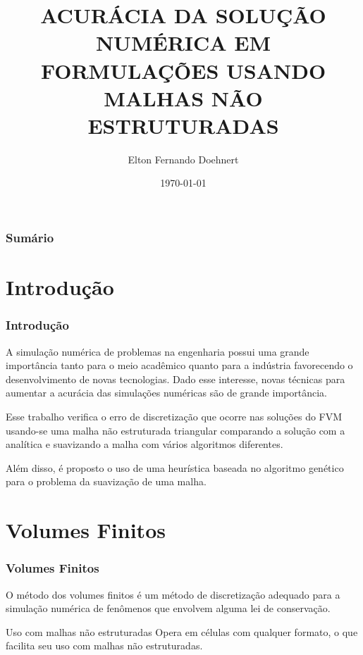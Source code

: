 \documentclass[brazil]{beamer}
\title[Acurácia Numérica]{ACURÁCIA DA SOLUÇÃO NUMÉRICA EM FORMULAÇÕES USANDO MALHAS NÃO
ESTRUTURADAS} %
\author{Elton Fernando Doehnert} %
\institute[UFPR] %
{
Universidade Federal do Paraná \\ %
\medskip
\textit{eltonfd@gmail.com} %
}
\date{\today} %
\begin{document}
\begin{frame}
  \titlepage %
\end{frame}

\begin{frame}
  \frametitle{Sumário} %
  \tableofcontents %
\end{frame}


\section{Introdução}
\begin{frame}
  \frametitle{Introdução}
  A simulação numérica de problemas na engenharia possui uma grande importância tanto para o meio acadêmico quanto para a indústria favorecendo o desenvolvimento de novas tecnologias. Dado esse interesse, novas técnicas para aumentar a acurácia das simulações numéricas são de grande importância.

  Esse trabalho verifica o erro de discretização que ocorre nas soluções do FVM usando-se uma malha não estruturada triangular comparando a solução com a analítica e suavizando a malha com vários algoritmos diferentes.

  Além disso, é proposto o uso de uma heurística baseada no algoritmo genético para o problema da suavização de uma malha.
\end{frame}

\section{Volumes Finitos}
\begin{frame}
  \frametitle{Volumes Finitos}

  \begin{definition}
    O método dos volumes finitos é um método de discretização adequado para a simulação numérica de fenômenos que envolvem alguma lei de conservação.
  \end{definition}

  \begin{block}{Uso com malhas não estruturadas}
    Opera em células com qualquer formato, o que facilita seu uso com malhas não estruturadas.
  \end{block}

\end{frame}
\end{document}
